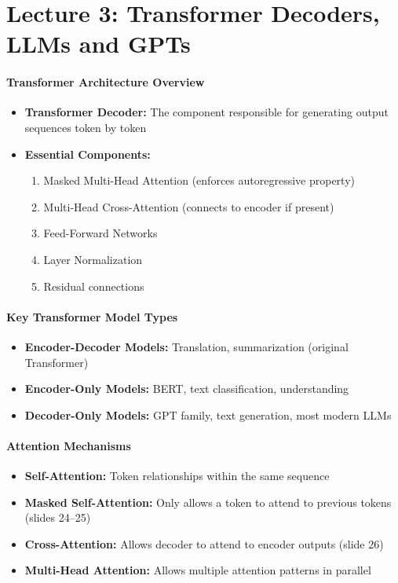 \chapter{\normalsize Lecture 3: Transformer Decoders, LLMs and GPTs}


\subsubsection*{Transformer Architecture Overview}
\begin{itemize}
    \item \textbf{Transformer Decoder:} The component responsible for generating output sequences token by token
    \item \textbf{Essential Components:}
    \begin{enumerate}
        \item Masked Multi-Head Attention (enforces autoregressive property)
        \item Multi-Head Cross-Attention (connects to encoder if present)
        \item Feed-Forward Networks
        \item Layer Normalization
        \item Residual connections
    \end{enumerate}
\end{itemize}

\subsubsection*{Key Transformer Model Types}
\begin{itemize}
    \item \textbf{Encoder-Decoder Models:} Translation, summarization (original Transformer)
    \item \textbf{Encoder-Only Models:} BERT, text classification, understanding
    \item \textbf{Decoder-Only Models:} GPT family, text generation, most modern LLMs
\end{itemize}

\subsubsection*{Attention Mechanisms}
\begin{itemize}
    \item \textbf{Self-Attention:} Token relationships within the same sequence
    \item \textbf{Masked Self-Attention:} Only allows a token to attend to previous tokens (slides 24--25)
    \item \textbf{Cross-Attention:} Allows decoder to attend to encoder outputs (slide 26)
    \item \textbf{Multi-Head Attention:} Allows multiple attention patterns in parallel
\end{itemize}

